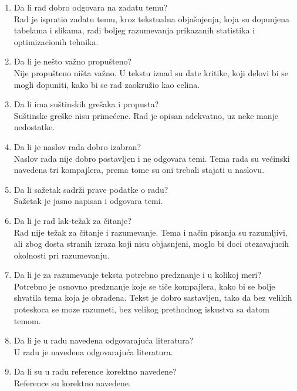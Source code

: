 \documentclass[a4paper]{report}
\begin{document}
\begin{enumerate}
\item Da li rad dobro odgovara na zadatu temu?\\
Rad je ispratio zadatu temu, kroz tekstualna objašnjenja, koja su dopunjena tabelama i slikama, radi boljeg razumevanja prikazanih statistika i optimizacionih tehnika.

\item Da li je nešto važno propušteno?\\
Nije propušteno ništa važno. U tekstu iznad su date kritike, koji delovi bi se mogli dopuniti, kako bi se rad zaokružio kao celina.

\item Da li ima suštinskih grešaka i propusta?\\
Suštinske greške nisu primećene. Rad je opisan adekvatno, uz neke manje nedostatke.

\item Da li je naslov rada dobro izabran?\\
Naslov rada nije dobro postavljen i ne odgovara temi. Tema rada su većinski navedena tri kompajlera, prema tome su oni trebali stajati u naslovu.

\item Da li sažetak sadrži prave podatke o radu?\\
Sažetak je jasno napisan i odgovara temi.

\item Da li je rad lak-težak za čitanje?\\
Rad nije težak za čitanje i razumevanje. Tema i način pisanja su razumljivi, ali zbog dosta stranih izraza koji nisu objasnjeni, moglo bi doci otezavajucih okolnosti pri razumevanju.

\item Da li je za razumevanje teksta potrebno predznanje i u kolikoj meri?\\
Potrebno je osnovno predznanje koje se tiče kompajlera, kako bi se bolje shvatila tema koja je obradena. Tekst je dobro sastavljen, tako da bez velikih poteskoca se moze razumeti, bez velikog prethodnog iskustva sa datom temom.

\item Da li je u radu navedena odgovarajuća literatura?\\
U radu je navedena odgovarajuća literatura.

\item Da li su u radu reference korektno navedene?\\
Reference su korektno navedene.


\end{enumerate}
\end{document}
